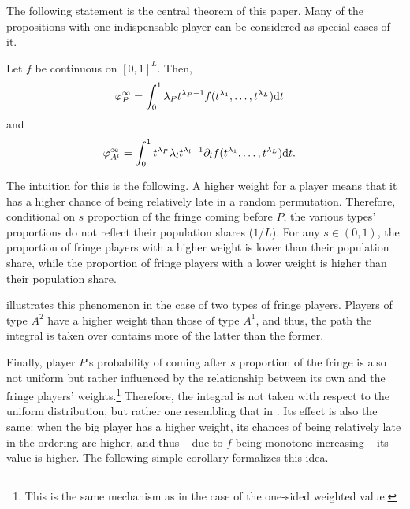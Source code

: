 The following statement is the central theorem of this paper.
Many of the propositions with one indispensable player can be considered as special cases of it.
\begin{proposition}
    \label{prop:many_sided_weighted}
    Let $f$ be continuous on $[0, 1]^L$.
    Then,
    \begin{align*}
        \varphi_P^\infty & = \int_0^1 \lambda_P t^{\lambda_P - 1} f(t^{\lambda_1}, \dots, t^{\lambda_L}) \mathrm{d}t
    \end{align*}
    and
    \begin{align*}
        \varphi_{A^l}^\infty & = \int_0^1 t^{\lambda_P} \lambda_l t^{\lambda_l - 1} \partial_l f(t^{\lambda_1}, \dots, t^{\lambda_L}) \mathrm{d}t.
    \end{align*}
\end{proposition}
The intuition for this is the following.
A higher weight for a player means that it has a higher chance of being relatively late in a random permutation.
Therefore, conditional on $s$ proportion of the fringe coming before $P$, the various types' proportions do not reflect their population shares ($1/L$).
For any $s \in (0, 1)$, the proportion of fringe players with a higher weight is lower than their population share, while the proportion of fringe players with a lower weight is higher than their population share.

 illustrates this phenomenon in the case of two types of fringe players.
Players of type $A^2$ have a higher weight than those of type $A^1$, and thus, the path the integral is taken over contains more of the latter than the former.

Finally, player $P$'s probability of coming after $s$ proportion of the fringe is also not uniform but rather influenced by the relationship between its own and the fringe players' weights.\footnote{
    This is the same mechanism as in the case of the one-sided weighted value.
} 
Therefore, the integral is not taken with respect to the uniform distribution, but rather one resembling that in .
Its effect is also the same: when the big player has a higher weight, its chances of being relatively late in the ordering are higher, and thus -- due to $f$ being monotone increasing -- its value is higher.
The following simple corollary formalizes this idea.


